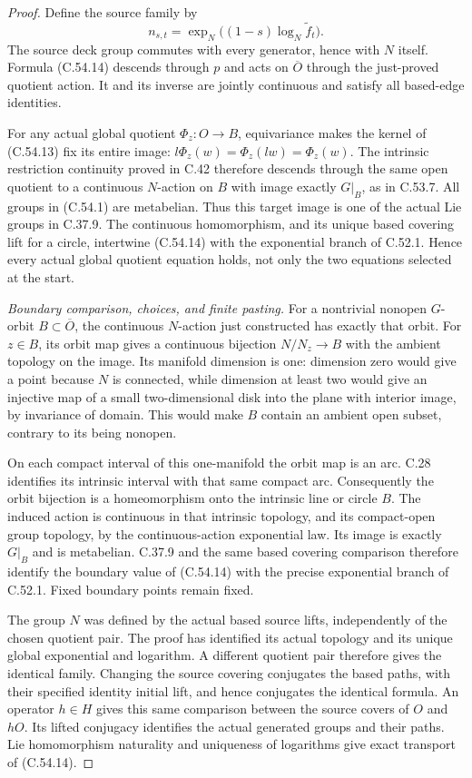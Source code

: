 \begin{proof}
Define the source family by
\[
          n_{s,t}=\exp_N\bigl((1-s)\log_N\widetilde f_t\bigr).
                                                               \tag{C.54.14}
\]
The source deck group commutes with every
generator, hence with $N$ itself.
Formula (C.54.14) descends through $p$
and acts on $\overline O$ through the
just-proved quotient action. It and its
inverse are jointly continuous and satisfy
all based-edge identities.

For any actual global quotient
$\Phi_z:O\to B$, equivariance makes the
kernel of (C.54.13) fix its entire image:
$l\Phi_z(w)=\Phi_z(lw)=\Phi_z(w)$.
The intrinsic restriction continuity
proved in C.42 therefore descends through
the same open quotient to a continuous
$N$-action on $B$ with image exactly
$G|_B$, as in C.53.7.
All groups in (C.54.1) are metabelian.
Thus this target image is one of the
actual Lie groups in C.37.9.
The continuous homomorphism, and its
unique based covering lift for a circle,
intertwine (C.54.14) with the exponential
branch of C.52.1. Hence every actual
global quotient equation holds, not only
the two equations selected at the start.

\emph{Boundary comparison, choices, and finite pasting.}
For a nontrivial nonopen $G$-orbit
$B\subset\overline O$, the continuous
$N$-action just constructed has exactly
that orbit. For $z\in B$, its orbit map
gives a continuous bijection
$N/N_z\to B$ with the ambient topology
on the image. Its manifold dimension is
one: dimension zero would give a point
because $N$ is connected, while dimension
at least two would give an injective
map of a small two-dimensional disk into
the plane with interior image, by
invariance of domain. This would make
$B$ contain an ambient open subset,
contrary to its being nonopen.

On each compact interval of this
one-manifold the orbit map is an arc.
C.28 identifies its intrinsic interval
with that same compact arc. Consequently
the orbit bijection is a homeomorphism
onto the intrinsic line or circle $B$.
The induced action is continuous in
that intrinsic topology, and its
compact-open group topology, by the
continuous-action exponential law.
Its image is exactly $G|_B$ and is
metabelian. C.37.9 and the same based
covering comparison therefore identify
the boundary value of (C.54.14) with
the precise exponential branch of
C.52.1. Fixed boundary points remain
fixed.

The group $N$ was defined by the actual
based source lifts, independently of
the chosen quotient pair. The proof
has identified its actual topology and
its unique global exponential and
logarithm. A different quotient pair
therefore gives the identical family.
Changing the source covering conjugates
the based paths, with their specified
identity initial lift, and hence
conjugates the identical formula.
An operator $h\in H$ gives this same
comparison between the source covers
of $O$ and $hO$. Its lifted conjugacy
identifies the actual generated groups
and their paths. Lie homomorphism
naturality and uniqueness of logarithms
give exact transport of (C.54.14).


\end{proof}
